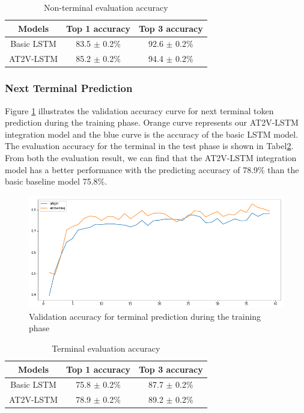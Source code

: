 \documentclass[E]{compsoft}
\begin{document}
\begin{table}
\centering
\begin{tabular}{ccc}
\hline
Models& Top 1 accuracy& Top 3 accuracy\\
\hline
Basic LSTM& 83.5 $\pm$ 0.2\% & 92.6 $\pm$ 0.2\% \\
AT2V-LSTM& 85.2 $\pm$ 0.2\% & 94.4 $\pm$ 0.2\% \\
\hline
\end{tabular}
\caption{Non-terminal evaluation accuracy}
\label{table:non-terminal-evalution-accuracy}
\end{table}



\subsubsection{Next Terminal Prediction} 
Figure \ref{fig:valid_accuracy_for_terminal} illustrates the validation accuracy curve for next terminal token prediction during the training phase. 
Orange curve represents our AT2V-LSTM integration model and the blue curve is the accuracy of the basic LSTM model. 
The evaluation accuracy for the terminal in the test phase is shown in Tabel\ref{table:terminal-evalution-accuracy}. 
From both the evaluation result, we can find that the AT2V-LSTM integration model has a better performance with the predicting accuracy of 78.9\% than the basic baseline model 75.8\%. 


\begin{figure}[!ht]
\centering
\includegraphics[scale=0.25]{pictures/tt_valid_accuracy.png}
\caption{Validation accuracy for terminal prediction during the training phase}
\label{fig:valid_accuracy_for_terminal}
\end{figure}


\begin{table}
\centering
\begin{tabular}{ccc}
\hline
Models& Top 1 accuracy& Top 3 accuracy\\
\hline
Basic LSTM& 75.8 $\pm$ 0.2\% & 87.7 $\pm$ 0.2\% \\
AT2V-LSTM& 78.9 $\pm$ 0.2\% & 89.2 $\pm$ 0.2\% \\
\hline
\end{tabular}
\caption{Terminal evaluation accuracy}
\label{table:terminal-evalution-accuracy}
\end{table}
\end{document}
